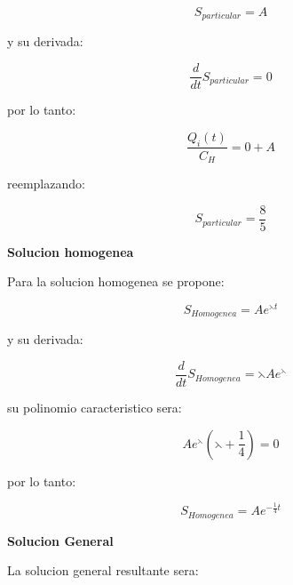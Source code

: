 \documentclass[a4paper,12pt]{article}
\begin{document}
\begin{equation}
S_{particular}=A
\end{equation}

y su derivada:

\begin{equation}
\frac{d}{dt}S_{particular}=0
\end{equation}

por lo tanto:\par

\begin{equation}
\frac{Q_{i}(t)}{C_{H}}=0+A
\end{equation}

reemplazando:\par

\begin{equation}
S_{particular}=\frac{8}{5}
\end{equation}

\newpage

\textbf{Solucion homogenea}\par
\vspace*{0.2in}
Para la solucion homogenea se propone:\par

\begin{equation}
S_{Homogenea}=Ae^{\leftthreetimes t}
\end{equation}

y su derivada:

\begin{equation}
\frac{d}{dt}S_{Homogenea}=\leftthreetimes A e^{\leftthreetimes}
\end{equation}

su polinomio caracteristico sera:

\begin{equation}
A e^{\leftthreetimes}(\leftthreetimes + \frac{1}{4})=0
\end{equation}

por lo tanto:\par

\begin{equation}
S_{Homogenea}=A e^{-\frac{1}{4}t}
\end{equation}

\vspace*{0.2in}

\textbf{Solucion General}\par
\vspace*{0.2in}

La solucion general resultante sera:\par
\end{document}
